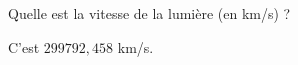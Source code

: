 \documentclass[12pt,a4paper]{article}
\begin{document}
\begin{question}

Quelle est la vitesse de la lumière (en km/s) ?

\begin{answers}
\end{answers}

\begin{explanations}
C'est $299792,458$ km/s.
\end{explanations}

\end{question}
\end{document}
